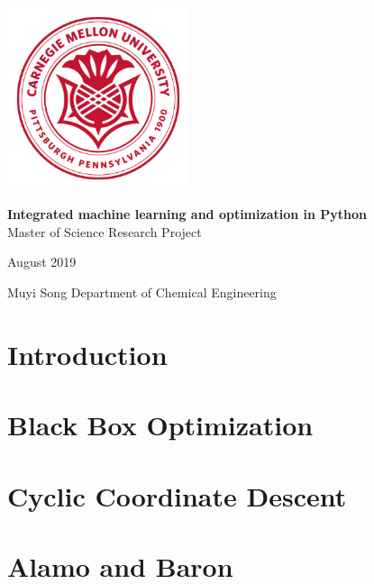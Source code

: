\documentclass{article}
\begin{document}
\begin{titlepage}
  \vbox{}
  \begin{center}
  \includegraphics[width=0.4\textwidth]{logo.png}\\[2.5cm]
  \end{center}

  \begin{center}
  {\large\textbf{Integrated machine learning \vspace{7.5pt} and optimization in Python}}\\[1.5cm]
  \large{Master of Science Research Project}
  \begin{center}\large{August 2019}\end{center}
  \vbox{}
  \begin{center}
    \large{Muyi Song}
    \large{Department of Chemical Engineering}
  \end{center}
  \end{center}
\end{titlepage}
\begin{center}
  \tableofcontents
\end{center}

\newpage
\section{Introduction}

\section{Black Box Optimization}

\section{Cyclic Coordinate Descent}

\section{Alamo and Baron}
\end{document}

